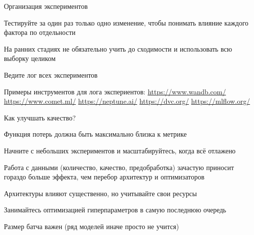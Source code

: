 \documentclass[notes,12pt, aspectratio=169]{beamer}
\newenvironment{wideitemize}{\itemize\addtolength{\itemsep}{10pt}}{\enditemize}
\begin{document}
\begin{frame}{Организация экспериментов}
	\begin{wideitemize}
		\item \alert{Тестируйте за один раз только одно изменение,} чтобы понимать влияние каждого фактора по отдельности 
		\item На ранних стадиях не обязательно учить до сходимости и использовать всю выборку целиком
		\item  Ведите лог всех экспериментов
		\item Примеры инструментов для лога экспериентов:  \newline 
		\url{https://www.wandb.com/}  \newline 
		\url{https://www.comet.ml/}  \newline 
		\url{https://neptune.ai/}  \newline 
		\url{https://dvc.org/}  \newline 
		\url{https://mlflow.org/}  \newline 
	\end{wideitemize}

\end{frame}


\begin{frame}{Как улучшать качество?}
	\begin{wideitemize}
		\item Функция потерь должна быть максимально близка к метрике
		
		\item  Начните с небольших экспериментов и масштабируйтесь, когда всё отлажено 
		
		\item  \alert{Работа с данными (количество, качество, предобработка) зачастую приносит гораздо больше эффекта, чем перебор архитектур и оптимизаторов}
		
		\item  Архитектуры влияют существенно, но учитывайте свои ресурсы
		
		\item Занимайтесь оптимизацией гиперпараметров в самую последнюю очередь 
		
		\item Размер батча важен (ряд моделей иначе просто не учится) 
	\end{wideitemize}
\end{frame}
\end{document}
